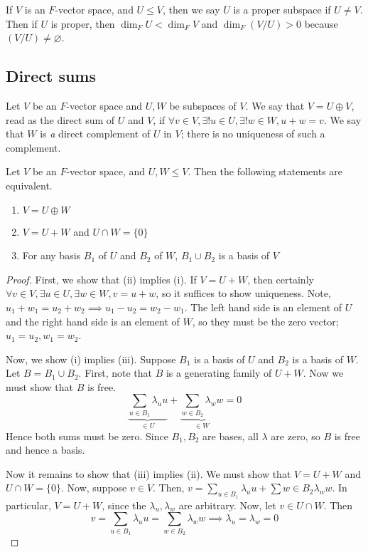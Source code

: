 \begin{remark}
	If \( V \) is an \( F \)-vector space, and \( U \leq V \), then we say \( U \) is a proper subspace if \( U \neq V \).
	Then if \( U \) is proper, then \( \dim_F U < \dim_F V \) and \( \dim_F ( V / U ) > 0 \) because \( (V/U) \neq \varnothing \).
\end{remark}

\subsection{Direct sums}
\begin{definition}
	Let \( V \) be an \( F \)-vector space and \( U, W \) be subspaces of \( V \).
	We say that \( V = U \oplus V \), read as the direct sum of \( U \) and \( V \), if \( \forall v \in V, \exists!
	u \in U, \exists!
	w \in W, u + w = v \).
	We say that \( W \) is \textit{a} direct complement of \( U \) in \( V \); there is no uniqueness of such a complement.
\end{definition}
\begin{lemma}
	Let \( V \) be an \( F \)-vector space, and \( U, W \leq V \).
	Then the following statements are equivalent.
	\begin{enumerate}
		\item \( V = U \oplus W \)
		\item \( V = U + W \) and \( U \cap W = \{0\} \)
		\item For any basis \( B_1 \) of \( U \) and \( B_2 \) of \( W \), \( B_1 \cup B_2 \) is a basis of \( V \)
	\end{enumerate}
\end{lemma}
\begin{proof}
	First, we show that (ii) implies (i).
	If \( V = U + W \), then certainly \( \forall v \in V, \exists u \in U, \exists w \in W, v = u + w \), so it suffices to show uniqueness.
	Note, \( u_1 + w_1 = u_2 + w_2 \implies u_1 - u_2 = w_2 - w_1 \).
	The left hand side is an element of \( U \) and the right hand side is an element of \( W \), so they must be the zero vector; \( u_1 = u_2, w_1 = w_2 \).

	Now, we show (i) implies (iii).
	Suppose \( B_1 \) is a basis of \( U \) and \( B_2 \) is a basis of \( W \).
	Let \( B = B_1 \cup B_2 \).
	First, note that \( B \) is a generating family of \( U + W \).
	Now we must show that \( B \) is free.
	\[
		\underbrace{\sum_{u \in B_1} \lambda_u u}_{\in U} + \underbrace{\sum_{w \in B_2} \lambda_w w}_{\in W} = 0
	\]
	Hence both sums must be zero.
	Since \( B_1, B_2 \) are bases, all \( \lambda \) are zero, so \( B \) is free and hence a basis.

	Now it remains to show that (iii) implies (ii).
	We must show that \( V = U + W \) and \( U \cap W = \{0\} \).
	Now, suppose \( v \in V \).
	Then, \( v = \sum_{u \in B_1} \lambda_u u + \sum{w \in B_2} \lambda_w w \).
	In particular, \( V = U + W \), since the \( \lambda_u, \lambda_w \) are arbitrary.
	Now, let \( v \in U \cap W \).
	Then
	\[
		v = \sum_{u \in B_1} \lambda_u u = \sum_{w \in B_2} \lambda_w w \implies \lambda_u = \lambda_w = 0
	\]
\end{proof}

